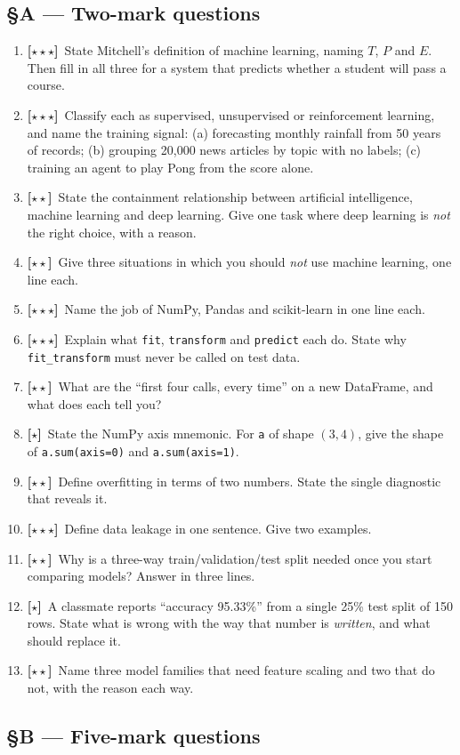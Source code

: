 \documentclass[11pt,a4paper]{article}
\newcommand{\LA}{{\footnotesize\textbf{[$\star\star\star$]}}}
\newcommand{\LB}{{\footnotesize\textbf{[$\star\star$]}}}
\newcommand{\LC}{{\footnotesize\textbf{[$\star$]}}}
\newcommand{\Q}[1]{\item[\textbf{#1}]}
\begin{document}
\subsection*{§A --- Two-mark questions}

\begin{enumerate}[leftmargin=2.2cm]
\Q{U1.1}\LA\ State Mitchell's definition of machine learning, naming $T$, $P$
  and $E$. Then fill in all three for a system that predicts whether a student
  will pass a course.
\Q{U1.2}\LA\ Classify each as supervised, unsupervised or reinforcement
  learning, and name the training signal: (a) forecasting monthly rainfall from
  50 years of records; (b) grouping 20{,}000 news articles by topic with no
  labels; (c) training an agent to play Pong from the score alone.
\Q{U1.3}\LB\ State the containment relationship between artificial
  intelligence, machine learning and deep learning. Give one task where deep
  learning is \emph{not} the right choice, with a reason.
\Q{U1.4}\LB\ Give three situations in which you should \emph{not} use machine
  learning, one line each.
\Q{U1.5}\LA\ Name the job of NumPy, Pandas and scikit-learn in one line each.
\Q{U1.6}\LA\ Explain what \texttt{fit}, \texttt{transform} and \texttt{predict}
  each do. State why \texttt{fit\_transform} must never be called on test data.
\Q{U1.7}\LB\ What are the ``first four calls, every time'' on a new DataFrame,
  and what does each tell you?
\Q{U1.8}\LC\ State the NumPy axis mnemonic. For \texttt{a} of shape $(3,4)$,
  give the shape of \texttt{a.sum(axis=0)} and \texttt{a.sum(axis=1)}.
\Q{U1.9}\LB\ Define overfitting in terms of two numbers. State the single
  diagnostic that reveals it.
\Q{U1.10}\LA\ Define data leakage in one sentence. Give two examples.
\Q{U1.11}\LB\ Why is a three-way train/validation/test split needed once you
  start comparing models? Answer in three lines.
\Q{U1.12}\LC\ A classmate reports ``accuracy 95.33\%'' from a single 25\% test
  split of 150 rows. State what is wrong with the way that number is
  \emph{written}, and what should replace it.
\Q{U1.13}\LB\ Name three model families that need feature scaling and two that
  do not, with the reason each way.
\end{enumerate}

\subsection*{§B --- Five-mark questions}
\end{document}
